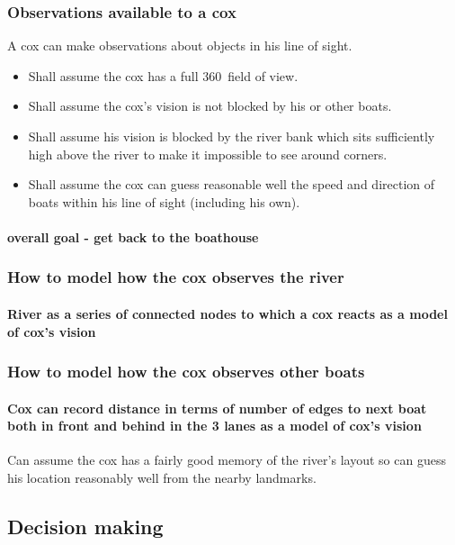       \subsubsection{Observations available to a cox}
      A cox can make observations about objects in his line of sight.
      \begin{itemize}
        \item Shall assume the cox has a full 360\textdegree\ field of
          view.
        \item Shall assume the cox's vision is not blocked by his or other boats.
        \item Shall assume his
        vision is blocked by the river bank which sits sufficiently high
        above the river to make it impossible to see around corners.
        \item Shall assume the cox can guess reasonable well the speed and
        direction of boats within his line of sight (including his own).
      \end{itemize}
        \paragraph{overall goal - get back to the boathouse}
      \subsubsection{How to model how the cox observes the river}
        \paragraph{River as a series of connected nodes to which a cox reacts as a model of cox's vision}
      \subsubsection{How to model how the cox observes other boats}
        \paragraph{Cox can record distance in terms of number of edges to next boat both in front and behind in the 3 lanes as a model of cox's vision}
        
      Can assume the cox has a fairly good memory of the river's layout so can guess his location reasonably well from the nearby landmarks.
  
      \subsection{Decision making}
